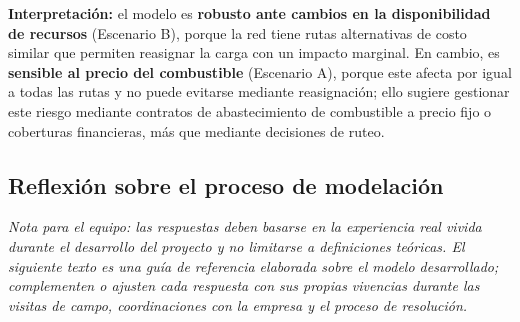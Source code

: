 \documentclass[11pt,a4paper]{article}
\begin{document}
\noindent\textbf{Interpretaci\'on:} el modelo es \textbf{robusto ante cambios en la disponibilidad de recursos} (Escenario B), porque la red tiene rutas alternativas de costo similar que permiten reasignar la carga con un impacto marginal. En cambio, es \textbf{sensible al precio del combustible} (Escenario A), porque este afecta por igual a todas las rutas y no puede evitarse mediante reasignaci\'on; ello sugiere gestionar este riesgo mediante contratos de abastecimiento de combustible a precio fijo o coberturas financieras, m\'as que mediante decisiones de ruteo.

\subsection{Reflexi\'on sobre el proceso de modelaci\'on}
\label{sec:reflexion}
\noindent\textit{Nota para el equipo: las respuestas deben basarse en la experiencia real vivida durante el desarrollo del proyecto y no limitarse a definiciones te\'oricas. El siguiente texto es una gu\'ia de referencia elaborada sobre el modelo desarrollado; complementen o ajusten cada respuesta con sus propias vivencias durante las visitas de campo, coordinaciones con la empresa y el proceso de resoluci\'on.}
\end{document}
